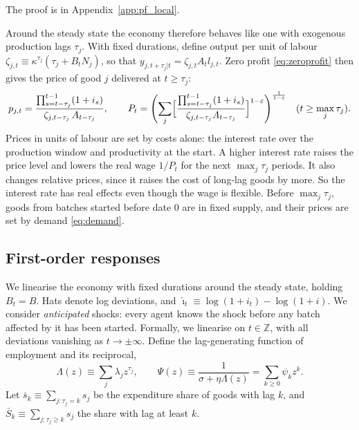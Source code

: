 \documentclass[11pt]{article}
\theoremstyle{definition}
\begin{document}
\noindent The proof is in Appendix~\ref{app:pf_local}.

\medskip
\noindent Around the steady state the economy therefore behaves like one with exogenous
production lags $\tau_j$. With fixed durations, define output per unit of labour
$\zeta_{j,t}\equiv\kappa^{\tau_j}(\tau_j+B_tN_j)$, so that $y_{j,t+\tau_j|t}=\zeta_{j,t}A_tl_{j,t}$.
Zero profit \eqref{eq:zeroprofit} then gives the price of good $j$ delivered at $t\ge\tau_j$:
\begin{equation}\label{eq:price}
  p_{j,t}=\frac{\prod_{s=t-\tau_j}^{t-1}(1+i_s)}{\zeta_{j,t-\tau_j}\,A_{t-\tau_j}},
  \qquad
  P_t=\Biggl(\sum_j\Bigl[\frac{\prod_{s=t-\tau_j}^{t-1}(1+i_s)}{\zeta_{j,t-\tau_j}A_{t-\tau_j}}\Bigr]^{1-\varepsilon}\Biggr)^{\frac{1}{1-\varepsilon}}
  \quad(t\ge\max_j\tau_j).
\end{equation}
Prices in units of labour are set by costs alone: the interest rate over the production window and
productivity at the start. A higher interest rate raises the price level and lowers the real wage
$1/P_t$ for the next $\max_j\tau_j$ periods. It also changes relative prices, since it raises the
cost of long-lag goods by more. So the interest rate has real effects even though the wage is
flexible. Before $\max_j\tau_j$, goods from batches started before date 0 are in fixed supply,
and their prices are set by demand \eqref{eq:demand}.

\subsection{First-order responses}\label{sec:firstorder}

We linearise the economy with fixed durations around the steady state, holding $B_t=B$. Hats denote
log deviations, and $\hat\imath_t\equiv\log(1+i_t)-\log(1+i)$. We consider \emph{anticipated} shocks:
every agent knows the shock before any batch affected by it has been started. Formally, we
linearise on $t\in\mathbb Z$, with all deviations vanishing as $t\to\pm\infty$. Define the
lag-generating function of employment and its reciprocal,
\begin{equation}\label{eq:Lambda}
  \Lambda(z)\equiv\sum_j\lambda_jz^{\tau_j},\qquad
  \Psi(z)\equiv\frac{1}{\sigma+\eta\Lambda(z)}=\sum_{k\ge0}\psi_kz^k .
\end{equation}
Let $\bar s_k\equiv\sum_{j:\tau_j=k}s_j$ be the expenditure share of goods with lag $k$, and
$\bar S_k\equiv\sum_{j:\tau_j\ge k}s_j$ the share with lag at least $k$.
\end{document}

